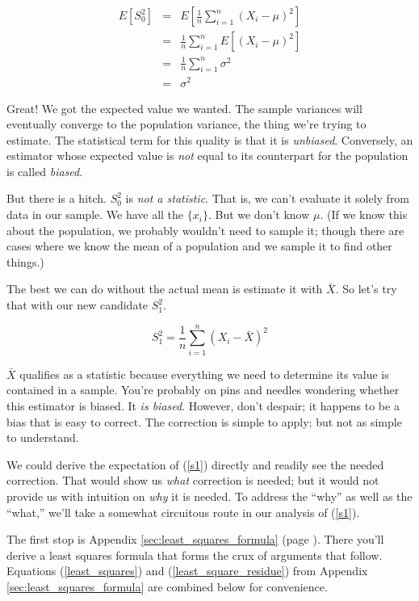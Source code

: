\documentclass[]{article}
\begin{document}
\begin{eqnarray}
E\left[ S_0^2 \right] &= &E \left[ \frac{1}{n} \sum_{i=1}^n 
         (X_i - \mu)^2\right] \nonumber \\
  &= &\frac{1}{n} \sum_{i=1}^n E \left[ (X_i - \mu)^2 \right] \nonumber \\
  &= &\frac{1}{n} \sum_{i=1}^n \sigma^2 \nonumber \\ 
  &= &\sigma^2  \label{es0}
\end{eqnarray}

Great!  We got the expected value we wanted.  The sample variances
will eventually converge to the population variance, the thing
we're trying to estimate.  The statistical term for this quality
is that it is \emph{unbiased}.  Conversely, an estimator whose
expected value is \emph{not} equal to its counterpart for the
population is called \emph{biased}.

But there is a hitch.
$S_0^2$ is \emph{not a statistic}.  That is, we can't evaluate it
solely from data in our sample.  We have all the $\{x_i\}$.  But
we don't know $\mu$.  (If we know this about the population,
we probably wouldn't need to sample it; though there are cases
where we know the mean of a population and we sample it to find
other things.)

The best we can do without the actual mean is estimate it with
$\bar{X}$.  So let's try that with our new candidate $S_1^2$.

\begin{equation} \label{s1}
S_1^2 = \frac{1}{n} \sum_{i=1}^n (X_i - \bar{X})^2
\end{equation}

$\bar{X}$ qualifies as a statistic because everything we
need to determine its value is contained in a sample.
You're probably on pins and needles wondering whether this
estimator is biased.  It \emph{is biased}.  However, don't
despair; it happens to be a bias that is easy to correct.
The correction is simple to apply; but not as simple to
understand.

We could derive the expectation of (\ref{s1}) directly
and readily see the needed correction.  That would
show us \emph{what} correction is needed; but it would
not provide us with intuition on \emph{why} it is needed.
To address the ``why'' as well as the ``what,'' we'll
take a somewhat circuitous route in our analysis of
(\ref{s1}).

The first stop is Appendix \ref{sec:least_squares_formula}
(page \pageref{sec:least_squares_formula}).
There you'll derive a least squares formula that forms
the crux of arguments that follow.  Equations
(\ref{least_squares}) and
(\ref{least_square_residue}) from 
Appendix \ref{sec:least_squares_formula}
are combined below for convenience.
\end{document}
